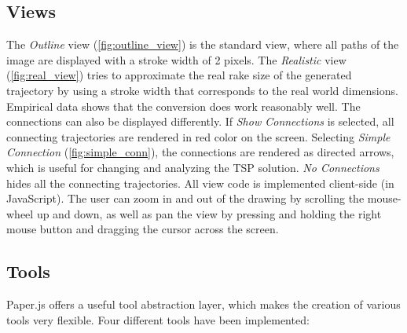 \subsection{Views} The \textit{Outline} view (\autoref{fig:outline_view}) is the standard view, where all paths of the image are displayed with a stroke width of 2 pixels. The \textit{Realistic} view (\autoref{fig:real_view}) tries to approximate the real rake size of the generated trajectory by using a stroke width that corresponds to the real world dimensions. Empirical data shows that the conversion does work reasonably well. The connections can also be displayed differently. If \textit{Show Connections} is selected, all connecting trajectories are rendered in red color on the screen. Selecting \textit{Simple Connection} (\autoref{fig:simple_conn}), the connections are rendered as directed arrows, which is useful for changing and analyzing the TSP solution. \textit{No Connections} hides all the connecting trajectories. All view code is implemented client-side (in JavaScript).
The user can zoom in and out of the drawing by scrolling the mouse-wheel up and down, as well as pan the view by pressing and holding the right mouse button and dragging the cursor across the screen.

\subsection{Tools}

Paper.js offers a useful tool abstraction layer, which makes the creation of various tools very flexible. Four different tools have been implemented:

